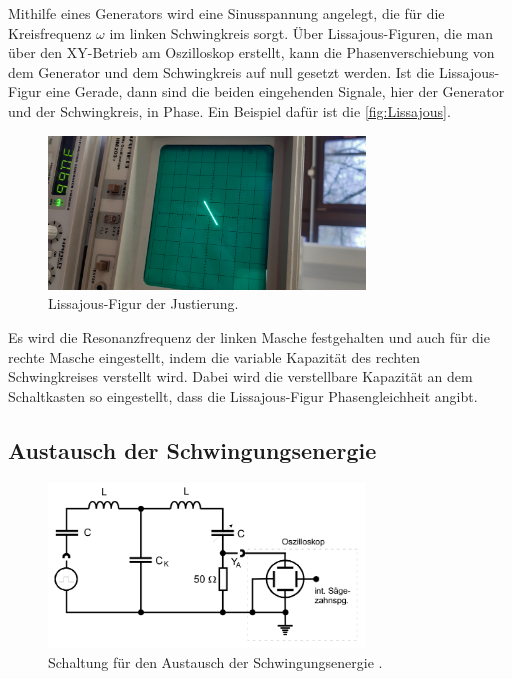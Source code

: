 \noindent Mithilfe eines Generators wird eine Sinusspannung angelegt, die  für die Kreisfrequenz $\omega$ im linken Schwingkreis sorgt. 
Über Lissajous-Figuren, die man über den XY-Betrieb am Oszilloskop erstellt, kann die Phasenverschiebung von dem Generator und 
dem Schwingkreis auf null gesetzt werden. Ist die Lissajous-Figur eine Gerade, dann sind die beiden eingehenden Signale, hier der
Generator und der Schwingkreis, in Phase. Ein Beispiel dafür ist die \autoref{fig:Lissajous}.
\begin{figure}[H]
    \centering
    \includegraphics[width=0.75\textwidth, angle=-90]{plots/Lissajour-Gerade.jpeg}
    \caption{Lissajous-Figur der Justierung.}
    \label{fig:Lissajous}
\end{figure}

\noindent Es wird die Resonanzfrequenz der linken Masche festgehalten und auch für die rechte Masche eingestellt, indem die variable Kapazität
des rechten Schwingkreises verstellt wird. Dabei wird die verstellbare Kapazität an dem Schaltkasten so eingestellt, dass die Lissajous-Figur Phasengleichheit 
angibt.

\subsection{Austausch der Schwingungsenergie}
\begin{figure}[H]
    \centering
    \includegraphics[width=0.75\textwidth]{plots/Schaltung1.png}
    \caption{Schaltung für den Austausch der Schwingungsenergie \cite{v355}.}
    \label{fig:schaltung1}
\end{figure}

